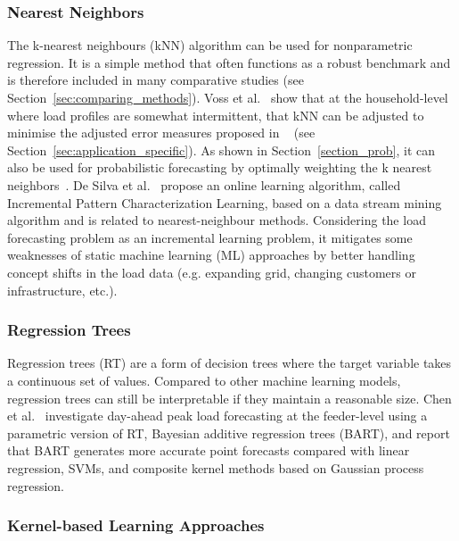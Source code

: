 \subsubsection{Nearest Neighbors}

The k-nearest neighbours (kNN) algorithm can be used for nonparametric regression. It is a simple method that often functions as a robust benchmark and is therefore included in many comparative studies (see Section~\ref{sec:comparing_methods}). Voss et al.~\cite{voss2018adjusted} show that at the household-level where load profiles are somewhat intermittent, that kNN can be adjusted to minimise the adjusted error measures proposed in ~\cite{Haben2014ane} (see Section~\ref{sec:application_specific}). As shown in Section~\ref{section_prob}, it can also be used for probabilistic forecasting by optimally weighting the k nearest neighbors~\cite{zufferey2020psf}. De Silva et al.~\cite{desilva2011ipc} propose an online learning algorithm, called Incremental Pattern Characterization Learning, based on a data stream mining algorithm and is related to nearest-neighbour methods. Considering the load forecasting problem as an incremental learning problem, it mitigates some weaknesses of static machine learning (ML) approaches by better handling concept shifts in the load data (e.g. expanding grid, changing customers or infrastructure, etc.).

\subsubsection{Regression Trees} \label{sec:trees_and_forests}

Regression trees (RT) are a form of decision trees where the target variable takes a continuous set of values. Compared to other machine learning models, regression trees can still be interpretable if they maintain a reasonable size. Chen et al.~\cite{chen2018dfl} investigate day-ahead peak load forecasting at the feeder-level using a parametric version of RT, Bayesian additive regression trees (BART), and report that BART generates more accurate point forecasts compared with linear regression, SVMs, and composite kernel methods based on Gaussian process regression.


\subsubsection{Kernel-based Learning Approaches}

